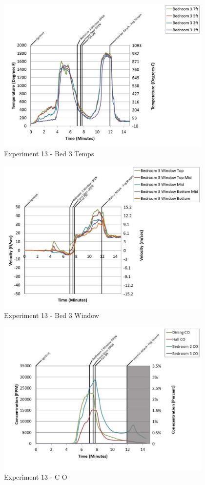\documentclass{article}
\begin{document}
\begin{appendices}
	\clearpage

	\begin{figure}[h!]
		\centering
		\includegraphics[height=3.05in]{0_Images/Results_Charts/Exp_13_Charts/Bed3Temps.pdf}
		\caption{Experiment 13 - Bed 3 Temps}
	\end{figure}
 

	\begin{figure}[h!]
		\centering
		\includegraphics[height=3.05in]{0_Images/Results_Charts/Exp_13_Charts/Bed3Window.pdf}
		\caption{Experiment 13 - Bed 3 Window}
	\end{figure}
 
	\clearpage

	\begin{figure}[h!]
		\centering
		\includegraphics[height=3.05in]{0_Images/Results_Charts/Exp_13_Charts/CO.pdf}
		\caption{Experiment 13 - C O}
	\end{figure}
 


\end{appendices}
\end{document}
